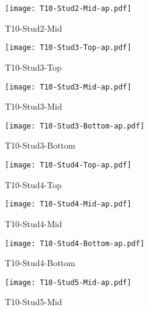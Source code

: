 \begin{figure}[htbp]
	\centering
			\texttt{[image: T10-Stud2-Mid-ap.pdf]}
			\caption*{T10-Stud2-Mid}
\end{figure}
\begin{figure}[htbp]
	\centering
			\texttt{[image: T10-Stud3-Top-ap.pdf]}
			\caption*{T10-Stud3-Top}
\end{figure}
\begin{figure}[htbp]
	\centering
			\texttt{[image: T10-Stud3-Mid-ap.pdf]}
			\caption*{T10-Stud3-Mid}
\end{figure}
\begin{figure}[htbp]
	\centering
			\texttt{[image: T10-Stud3-Bottom-ap.pdf]}
			\caption*{T10-Stud3-Bottom}
\end{figure}
\begin{figure}[htbp]
	\centering
			\texttt{[image: T10-Stud4-Top-ap.pdf]}
			\caption*{T10-Stud4-Top}
\end{figure}
\begin{figure}[htbp]
	\centering
			\texttt{[image: T10-Stud4-Mid-ap.pdf]}
			\caption*{T10-Stud4-Mid}
\end{figure}
\begin{figure}[htbp]
	\centering
			\texttt{[image: T10-Stud4-Bottom-ap.pdf]}
			\caption*{T10-Stud4-Bottom}
\end{figure}
\begin{figure}[htbp]
	\centering
			\texttt{[image: T10-Stud5-Mid-ap.pdf]}
			\caption*{T10-Stud5-Mid}
\end{figure}

\pagebreak